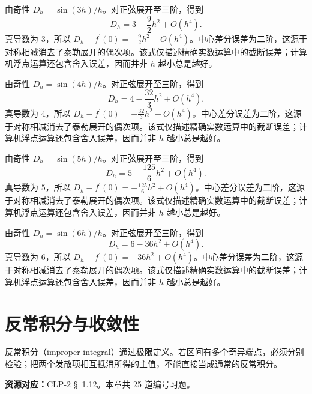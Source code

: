 \documentclass[UTF8,12pt,a4paper,fontset=fandol]{ctexart}
\begin{document}
\begin{solve}\label{ans:c18q21}
由奇性 $D_h=\sin(3h)/h$。对正弦展开至三阶，得到
\[
D_h=3-\frac{9}{2}h^2+O(h^4).
\]
真导数为 $3$，所以 $D_h-f^{\prime}(0)=-\frac{9}{2}h^2+O(h^4)$。中心差分误差为二阶，这源于对称相减消去了泰勒展开的偶次项。该式仅描述精确实数运算中的截断误差；计算机浮点运算还包含舍入误差，因而并非 $h$ 越小总是越好。
\end{solve}

\begin{solve}\label{ans:c18q22}
由奇性 $D_h=\sin(4h)/h$。对正弦展开至三阶，得到
\[
D_h=4-\frac{32}{3}h^2+O(h^4).
\]
真导数为 $4$，所以 $D_h-f^{\prime}(0)=-\frac{32}{3}h^2+O(h^4)$。中心差分误差为二阶，这源于对称相减消去了泰勒展开的偶次项。该式仅描述精确实数运算中的截断误差；计算机浮点运算还包含舍入误差，因而并非 $h$ 越小总是越好。
\end{solve}

\begin{solve}\label{ans:c18q23}
由奇性 $D_h=\sin(5h)/h$。对正弦展开至三阶，得到
\[
D_h=5-\frac{125}{6}h^2+O(h^4).
\]
真导数为 $5$，所以 $D_h-f^{\prime}(0)=-\frac{125}{6}h^2+O(h^4)$。中心差分误差为二阶，这源于对称相减消去了泰勒展开的偶次项。该式仅描述精确实数运算中的截断误差；计算机浮点运算还包含舍入误差，因而并非 $h$ 越小总是越好。
\end{solve}

\begin{solve}\label{ans:c18q24}
由奇性 $D_h=\sin(6h)/h$。对正弦展开至三阶，得到
\[
D_h=6-36h^2+O(h^4).
\]
真导数为 $6$，所以 $D_h-f^{\prime}(0)=-36h^2+O(h^4)$。中心差分误差为二阶，这源于对称相减消去了泰勒展开的偶次项。该式仅描述精确实数运算中的截断误差；计算机浮点运算还包含舍入误差，因而并非 $h$ 越小总是越好。
\end{solve}

\clearpage
\section{反常积分与收敛性}\label{sec:ch19}
反常积分（improper integral）通过极限定义。若区间有多个奇异端点，必须分别检验；把两个发散项相互抵消所得的主值，不能直接当成通常的反常积分。

\textbf{资源对应：}CLP-2 \S~1.12。本章共 25 道编号习题。
\end{document}

